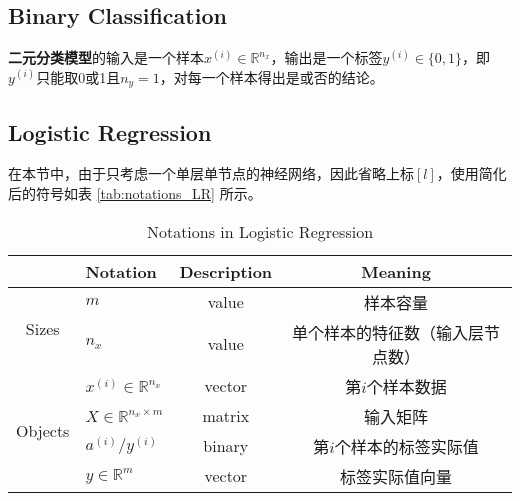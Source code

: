\subsection{Binary Classification}
\textbf{二元分类模型}的输入是一个样本$x^{(i)} \in \mathbb{R}^{n_x}$，输出是一个标签$y^{(i)} \in \{0, 1\}$，即$y^{(i)}$只能取0或1且$n_y=1$，对每一个样本得出是或否的结论。

\subsection{Logistic Regression}

在本节中，由于只考虑一个单层单节点的神经网络，因此省略上标$[l]$，使用简化后的符号如表 \ref{tab:notations_LR} 所示。

\begin{table}[htb!]
    \centering
    \begin{threeparttable}
    \caption{Notations in Logistic Regression}
    \begin{tabular}{clcc}
        \hline
                                    & \textbf{Notation}                         & \textbf{Description} & \textbf{Meaning}                                                   \\ \hline
        \multirow{2}{*}{Sizes}      & $m$                                       & value                & 样本容量                                                               \\
                                    & $n_x$                                     & value                & 单个样本的特征数（输入层节点数）                                         \\ \hline
        \multirow{8}{*}{Objects}    & $x^{(i)} \in \mathbb{R}^{n_x}$            & vector               & 第$i$个样本数据                                                          \\
                                    & $X \in {\mathbb{R}^{n_x \times m}}$       & matrix               & 输入矩阵                                                               \\
                                    & $a^{(i)} / y^{(i)}$                       & binary               & 第$i$个样本的标签实际值                                                        \\
                                    & $y \in \mathbb{R}^{m}$					& vector               & 标签实际值向量                                                          \\

\end{tabular}
\end{threeparttable}
\end{table}

